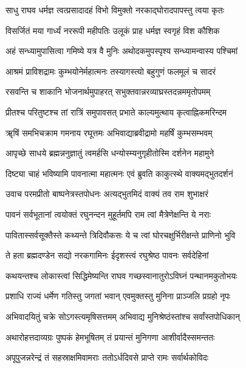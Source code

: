\twolineshloka
{साधु राघव धर्मज्ञ त्वत्प्रसादादहं विभो}
{विमुक्तो नरकाद्घोरादपापस्तु त्वया कृतः}%

\twolineshloka
{विसर्जितं मया गार्ध्यं नररूपी महीपतिः}
{उलूकं प्राह धर्मज्ञ स्वगृहं विश कौशिक}%

\twolineshloka
{अहं सन्ध्यामुपासित्वा गमिष्ये यत्र वै मुनिः}
{अथोदकमुपस्पृश्य सन्ध्यामन्वास्य पश्चिमां}%

\twolineshloka
{आश्रमं प्राविशद्रामः कुम्भयोनेर्महात्मनः}
{तस्यागस्त्यो बहुगुणं फलमूलं च सादरं}%

\twolineshloka
{रसवन्ति च शाकानि भोजनार्थमुपाहरत्}
{सभुक्तवान्नरव्याघ्रस्तदन्नममृतोपमम्}%

\twolineshloka
{प्रीतश्च परितुष्टश्च तां रात्रिं समुपावसत्}
{प्रभाते काल्यमुत्थाय कृत्वाह्निकमरिन्दम}%

\twolineshloka
{ॠषिं समभिचक्राम गमनाय रघूत्तमः}
{अभिवाद्याब्रवीद्रामो महर्षिं कुम्भसम्भवम्}%

\twolineshloka
{आपृच्छे साधये ब्रह्मन्ननुज्ञातुं त्वमर्हसि}
{धन्योस्म्यनुगृहीतोस्मि दर्शनेन महामुने}%

\twolineshloka
{दिष्ट्या चाहं भविष्यामि पावनात्मा महात्मनः}
{एवं ब्रुवति काकुत्स्थे वाक्यमद्भुतदर्शनं}%

\twolineshloka
{उवाच परमप्रीतो बाष्पनेत्रस्तपोधनः}
{अत्यद्भुतमिदं वाक्यं तव राम शुभाक्षरं}%

\twolineshloka
{पावनं सर्वभूतानां त्वयोक्तं रघुनन्दन}
{मुहूर्तमपि राम त्वां मैत्रेणेक्षन्ति ये नराः}%

\twolineshloka
{पावितास्सर्वसूक्तैस्ते कथ्यन्ते त्रिदिवौकसः}
{ये च त्वां घोरचक्षुर्भिरीक्षन्ते प्राणिनो भुवि}%

\twolineshloka
{ते हता ब्रह्मदण्डेन सद्यो नरकगामिनः}
{ईदृशस्त्वं रघुश्रेष्ठ पावनः सर्वदेहिनां}%

\twolineshloka
{कथयन्तश्च लोकास्त्वां सिद्धिमेष्यन्ति राघव}
{गच्छस्वानातुरोऽविघ्नं पन्थानमकुतोभयः}%

\twolineshloka
{प्रशाधि राज्यं धर्मेण गतिस्तु जगतां भवान्}
{एवमुक्तस्तु मुनिना प्राञ्जलि प्रग्रहो नृपः}%

\twolineshloka
{अभिवादयितुं चक्रे सोऽगस्त्यमृषिसत्तमम्}
{अभिवाद्य मुनिश्रेष्ठंस्तांश्च सर्वांस्तपोधिकान्}%

\twolineshloka
{अथारोहत्तदाव्यग्रः पुष्पकं हेमभूषितम्}
{तं प्रयान्तं मुनिगणा आशीर्वादैस्समन्ततः}%

\twolineshloka
{अपूपुजन्नरेन्द्रं तं सहस्राक्षमिवामराः}
{ततोऽर्धदिवसे प्राप्ते रामः सर्वार्थकोविदः}%

